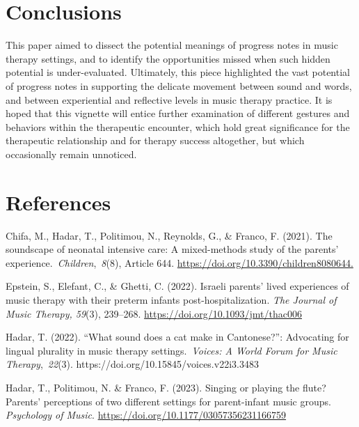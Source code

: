\documentclass[authordate, empirical, issue]{jote-new-article}
\begin{document}
\section{Conclusions}



This paper aimed to dissect the potential meanings of progress notes in music therapy settings, and to identify the opportunities missed when such hidden potential is under-evaluated. Ultimately, this piece highlighted the vast potential of progress notes in supporting the delicate movement between sound and words, and between experiential and reflective levels in music therapy practice. It is hoped that this vignette will entice further examination of different gestures and behaviors within the therapeutic encounter, which hold great significance for the therapeutic relationship and for therapy success altogether, but which occasionally remain unnoticed.







\section{References}



\hspace*{\parindent}Chifa, M., Hadar, T., Politimou, N., Reynolds, G., \& Franco, F. (2021). The soundscape of neonatal intensive care: A mixed-methods study of the parents' experience. \emph{Children}, \emph{8}(8), Article 644. \href{https://doi.org/10.3390/children8080644}{https://doi.org/10.3390/children8080644}\underline{.}



Epstein, S., Elefant, C., \& Ghetti, C. (2022). Israeli parents' lived experiences of music therapy with their preterm infants post-hospitalization. \emph{The Journal of Music Therapy, 59}(3), 239--268. \href{https://doi.org/10.1093/jmt/thac006}{https://doi.org/10.1093/jmt/thac006}



Hadar, T. (2022). “What sound does a cat make in Cantonese?”: Advocating for lingual plurality in music therapy settings. \emph{Voices: A World Forum for Music Therapy}, \emph{22}(3). https://doi.org/10.15845/voices.v22i3.3483



Hadar, T., Politimou, N. \& Franco, F. (2023). Singing or playing the flute? Parents' perceptions of two different settings for parent-infant music groups. \emph{Psychology of Music}. \href{https://doi.org/10.1177/03057356231166759}{https://doi.org/10.1177/03057356231166759}
\end{document}
